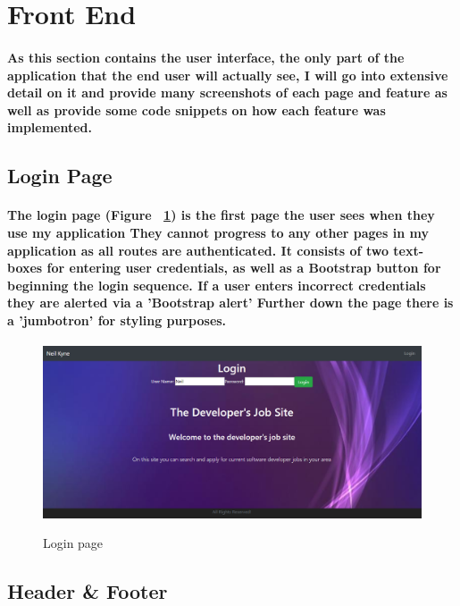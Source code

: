 \section{Front End}
\paragraph{As this section contains the user interface, the only part of the application that the end user will actually see, I will go into extensive detail on it and provide many screenshots of each page and feature as well as provide some code snippets on how each feature was implemented.}
\subsection{Login Page}
\paragraph{The login page (Figure ~\ref{login_label}) is the first page the user sees when they use my application They cannot progress to any other pages in my application as all routes are authenticated. It consists of two text-boxes for entering user credentials, as well as a Bootstrap button for beginning the login sequence. If a user enters incorrect credentials they are alerted via a 'Bootstrap alert' Further down the page there is a 'jumbotron' for styling purposes.}
\begin{figure}[ht]
    \centering
    \includegraphics[scale=0.3]{Images/login.png} 
    \label{login_label}
    \caption{Login page}
\end{figure}

\subsection{Header \& Footer}
